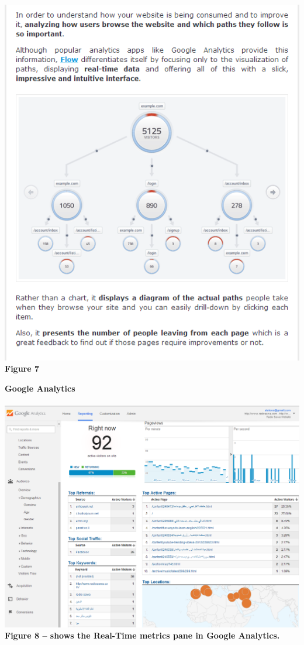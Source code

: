 \documentclass[12pt]{article}
\begin{document}
\noindent\includegraphics[scale=0.7]{img/flow1} \\
\noindent\textbf{Figure 7} \\

\newpage


\noindent\textbf{Google Analytics} \\ \\
\noindent\includegraphics[scale=0.4]{img/google_analytics} \\
\noindent\textbf{Figure 8 -- shows the Real-Time metrics pane in Google Analytics.} \\
\end{document}

